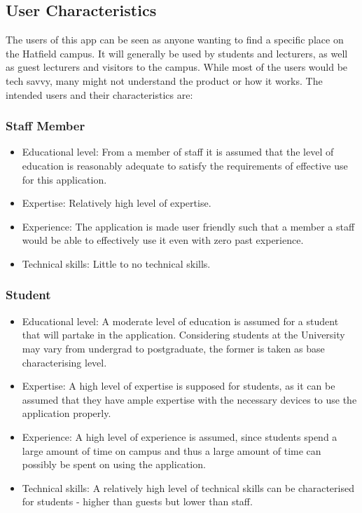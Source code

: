 \documentclass[runningheads,a4paper]{article}
\begin{document}
\subsection{User Characteristics}
The users of this app can be seen as anyone wanting to find a specific place on the Hatfield campus. It will generally be used by students and lecturers, as well as guest lecturers and visitors to the campus. While most of the users would be tech savvy, many might not understand the product or how it works. The intended users and their characteristics are:

\subsubsection{Staff Member}

\begin{itemize}
	 
		\item Educational level: From a member of staff it is assumed that the level of education is reasonably adequate to satisfy the requirements of effective use for this application.
		\item Expertise: Relatively high level of expertise.
		\item Experience: The application is made user friendly such that a member a staff would be able to effectively use it even with zero past experience.
		\item Technical skills: Little to no technical skills.
	 
\end{itemize}

\subsubsection{Student}

\begin{itemize}
	 
		\item Educational level: A moderate level of education is assumed for a student that will partake in the application. Considering students at the University may vary from undergrad to postgraduate, the former is taken as base characterising level. 
		\item Expertise: A high level of expertise is supposed for students, as it can be assumed that they have ample expertise with the necessary devices to use the application properly.
		\item Experience: A high level of experience is assumed, since students spend a large amount of time on campus and thus a large amount of time can possibly be spent on using the application.
		\item Technical skills: A relatively high level of technical skills can be characterised for students - higher than guests but lower than staff.
	 
\end{itemize}
\end{document}
